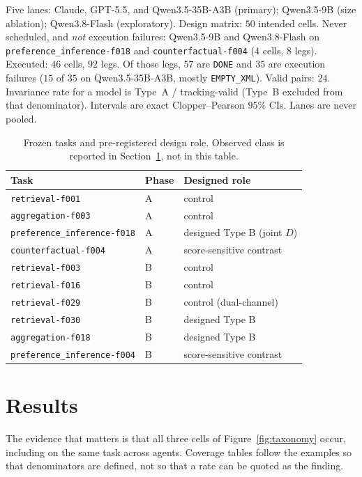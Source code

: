 \documentclass[11pt]{article}
\newcommand{\task}[1]{\texttt{#1}}
\begin{document}
Five lanes: Claude, GPT-5.5, and Qwen3.5-35B-A3B (primary); Qwen3.5-9B
(size ablation); Qwen3.8-Flash (exploratory). Design matrix:
$50$ intended cells. Never scheduled, and \emph{not} execution failures:
Qwen3.5-9B and Qwen3.8-Flash on \task{preference\_inference-f018} and
\task{counterfactual-f004} ($4$ cells, $8$ legs). Executed: $46$ cells,
$92$ legs. Of those legs, $57$ are \texttt{DONE} and $35$ are execution
failures ($15$ of $35$ on Qwen3.5-35B-A3B, mostly \texttt{EMPTY\_XML}).
Valid pairs: $24$. Invariance rate for a model is Type~A / tracking-valid
(Type~B excluded from that denominator). Intervals are exact
Clopper--Pearson $95\%$ CIs. Lanes are never pooled.

\begin{table}[t]
\centering
\small
\caption{Frozen tasks and pre-registered design role. Observed class is
reported in Section~\ref{sec:results}, not in this table.}
\label{tab:protocol}
\begin{tabular}{lll}
\toprule
Task & Phase & Designed role \\
\midrule
\task{retrieval-f001} & A & control \\
\task{aggregation-f003} & A & control \\
\task{preference\_inference-f018} & A & designed Type B (joint $D$) \\
\task{counterfactual-f004} & A & score-sensitive contrast \\
\task{retrieval-f003} & B & control \\
\task{retrieval-f016} & B & control \\
\task{retrieval-f029} & B & control (dual-channel) \\
\task{retrieval-f030} & B & designed Type B \\
\task{aggregation-f018} & B & designed Type B \\
\task{preference\_inference-f004} & B & score-sensitive contrast \\
\bottomrule
\end{tabular}
\end{table}

\section{Results}
\label{sec:results}

The evidence that matters is that all three cells of
Figure~\ref{fig:taxonomy} occur, including on the same task across
agents. Coverage tables follow the examples so that denominators are
defined, not so that a rate can be quoted as the finding.
\end{document}

